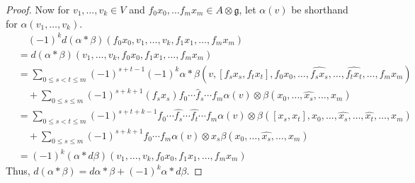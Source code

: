 \documentclass[12pt]{amsart}
\newcommand{\g}{{\mathfrak{g}}}
\theoremstyle{definition}
\begin{document}
\begin{proof}
Now for $v_1, \dots, v_k \in V$ and $f_0  x_0, \dots f_m  x_m \in A \otimes \g$, let $\alpha(v)$ be shorthand for $\alpha(v_1, \dots, v_k)$. 
\begin{align*}
& \quad (-1)^k d(\alpha \ast \beta) (f_0  x_0, v_1, \dots, v_k, f_1  x_1, \dots, f_m  x_m) \\
&= d(\alpha \ast \beta) (v_1, \dots, v_k, f_0  x_0, f_1  x_1, \dots, f_m  x_m) \\
&= \sum_{0 \leq s< t\leq m} (-1)^{s+t-1}(-1)^{k} \alpha \ast \beta (v, [f_s  x_s, f_t  x_t],f_0  x_0, \dots, \widehat{f_s  x_s}, \dots, \widehat{f_t  x_t}, \dots, f_m  x_m ) \\
& \quad + \sum_{0 \leq s \leq m} (-1)^{s+k+1} (f_s  x_s) f_0 \cdots \hat{f}_s \cdots f_m \alpha(v) \otimes \beta( x_0,  \dots, \widehat{ x_s}, \dots,  x_m)\\ 
&= \sum_{0 \leq s< t\leq m} (-1)^{s+t+k-1} f_0 \cdots \hat{f_s} \cdots \hat{f_t} \cdots f_m \alpha(v) \otimes \beta ([ x_s, x_t],  x_0, \dots, \widehat{x_s}, \dots, \widehat{x_t}, \dots, x_m ) \\
&\quad + \sum_{0 \leq s \leq m} (-1)^{s+k+1} f_0 \cdots f_m \alpha(v) \otimes x_s\beta( x_0,  \dots, \widehat{ x_s}, \dots,  x_m)\\ 
& = (-1)^k (\alpha \ast d \beta) (v_1, \dots, v_k, f_0  x_0, f_1 x_1, \dots, f_m  x_m)
\end{align*}
Thus, $d(\alpha \ast \beta) = d\alpha \ast \beta + (-1)^k \alpha \ast d \beta$. 
\end{proof}
\end{document}
